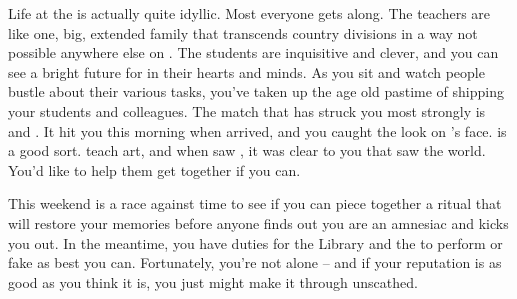 \documentclass[char]{GL2020}
\begin{document}
Life at the \pSchool{} is actually quite idyllic. Most everyone gets along. The teachers are like one, big, extended family that transcends country divisions in a way not possible anywhere else on \pEarth{}. The students are inquisitive and clever, and you can see a bright future for \pEarth{} in their hearts and minds. As you sit and watch people bustle about their various tasks, you’ve taken up the age old pastime of shipping your students and colleagues. The match that has struck you most strongly is \cHeadScientist{} and \cChupAvenger{}. It hit you this morning when \cHeadScientist{} arrived, and you caught the look on \cChupAvenger{}’s face. \cChupAvenger{} is a good sort. \cChupAvenger{\They} teach\cChupAvenger{\plural} art, and when \cChupAvenger{\they} saw \cHeadScientist{}, it was clear to you that \cChupAvenger{\they} saw the world. You’d like to help them get together if you can.

This weekend is a race against time to see if you can piece together a ritual that will restore your memories before anyone finds out you are an amnesiac and kicks you out. In the meantime, you have duties for the Library and the \pSc{} to perform or fake as best you can. Fortunately, you’re not alone -- and if your reputation is as good as you think it is, you just might make it through unscathed.
\end{document}
